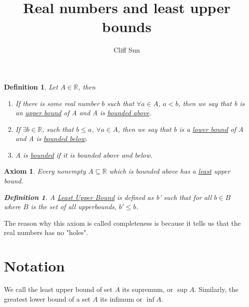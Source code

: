 \documentclass{article}
\title{Real numbers and least upper bounds}
\author{Cliff Sun}
\newtheorem{definition}[theorem]{Definition}
\newtheorem{axiom}[theorem]{Axiom}
\begin{document}
\maketitle

\begin{definition}
    Let $A \in \mathbb{R}$, then
    \begin{enumerate}
        \item If there is some real number $b$ such that $\forall a \in A$, $a < b$, then we say that b is an \underline{upper bound} of A and A is \underline{bounded above}.
        \item If $\exists b \in \mathbb{R}$, such that $b \leq a$, $\forall a \in A$, then we say that b is a \underline{lower bound} of A and A is \underline{bounded below}. 
        \item A is \underline{bounded} if it is bounded above and below. 
    \end{enumerate}
\end{definition}

\begin{axiom}

    Every nonempty $A \subseteq \mathbb{R}$ which is bounded above has a \underline{least} upper bound. 

    \begin{definition}
        A \underline{Least Upper Bound} is defined as b' such that for all $b \in B$ where $B$ is the set of all upperbounds, $b' \leq b$.
    \end{definition}

\end{axiom}

The reason why this axiom is called completeness is because it tells us that the real numbers has no "holes".

\section*{Notation}

We call the least upper bound of set $A$ its supremum, or $\sup A$. Similarly, the greatest lower bound of a set $A$ its infimum or $\inf A$. 
\end{document}

